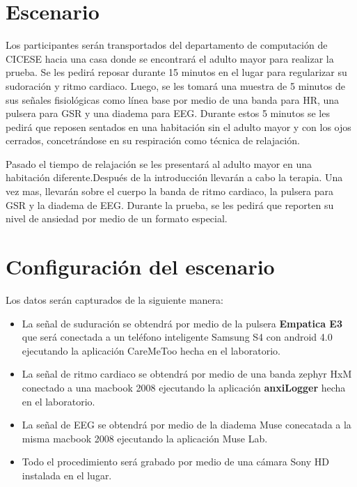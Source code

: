 \section{Escenario}
	Los participantes ser\'an transportados del departamento de computaci\'on de CICESE hacia una casa donde se encontrar\'a el adulto mayor
	para realizar la prueba.
	Se les pedir\'a reposar durante 15 minutos en el lugar para regularizar su sudoraci\'on y ritmo cardiaco.
	Luego, se les tomar\'a una muestra de 5 minutos de sus se\~nales fisiol\'ogicas como l\'inea base por medio de una banda para HR, una pulsera para GSR y una diadema para EEG. Durante estos 5 minutos
	se les pedir\'a  que reposen sentados en una habitaci\'on sin el adulto mayor y con los ojos cerrados, concetr\'andose en su respiraci\'on como t\'ecnica de relajaci\'on.

	Pasado el tiempo de relajaci\'on se les presentar\'a al adulto mayor en una habitaci\'on diferente.Despu\'es de la introducci\'on llevar\'an a cabo la terapia. Una vez mas, llevar\'an sobre el cuerpo la banda de ritmo cardiaco, la pulsera para GSR y la diadema de EEG. Durante la prueba, se les pedir\'a que reporten su nivel de ansiedad por medio de un formato especial.

\section{Configuraci\'on del escenario}
	
	Los datos ser\'an capturados de la siguiente manera:
	\begin{itemize}
		\item{La se\~nal de suduraci\'on se obtendr\'a por medio de la pulsera \textbf{Empatica E3} que ser\'a conectada a un tel\'efono inteligente Samsung S4 con android 4.0 ejecutando la aplicaci\'on CareMeToo hecha en el laboratorio.}
		\item{La se\~nal de ritmo cardiaco se obtendr\'a por medio de una banda zephyr HxM conectado a una macbook 2008 ejecutando la aplicaci\'on \textbf{anxiLogger} hecha en el laboratorio.}
		\item{La se\~nal de EEG se obtendr\'a por medio de la diadema Muse conecatada a la misma macbook 2008 ejecutando la aplicaci\'on Muse Lab.}
		\item{Todo el procedimiento ser\'a grabado por medio de una c\'amara Sony HD instalada en el lugar.}
	\end{itemize}
